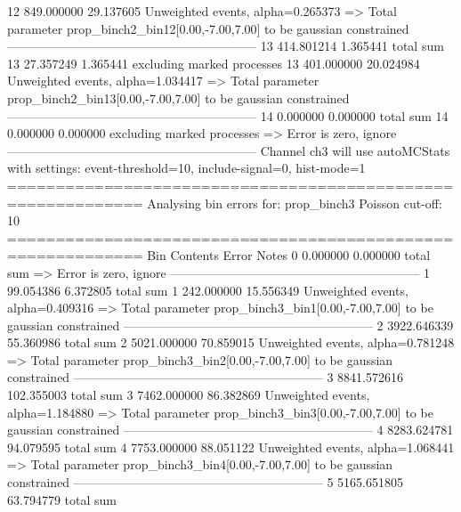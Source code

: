12         849.000000      29.137605       Unweighted events, alpha=0.265373
  => Total parameter prop_binch2_bin12[0.00,-7.00,7.00] to be gaussian constrained
------------------------------------------------------------
13         414.801214      1.365441        total sum                     
13         27.357249       1.365441        excluding marked processes    
13         401.000000      20.024984       Unweighted events, alpha=1.034417
  => Total parameter prop_binch2_bin13[0.00,-7.00,7.00] to be gaussian constrained
------------------------------------------------------------
14         0.000000        0.000000        total sum                     
14         0.000000        0.000000        excluding marked processes    
  => Error is zero, ignore      
------------------------------------------------------------
Channel ch3 will use autoMCStats with settings: event-threshold=10, include-signal=0, hist-mode=1
============================================================
Analysing bin errors for: prop_binch3
Poisson cut-off: 10
============================================================
Bin        Contents        Error           Notes                         
0          0.000000        0.000000        total sum                     
  => Error is zero, ignore      
------------------------------------------------------------
1          99.054386       6.372805        total sum                     
1          242.000000      15.556349       Unweighted events, alpha=0.409316
  => Total parameter prop_binch3_bin1[0.00,-7.00,7.00] to be gaussian constrained
------------------------------------------------------------
2          3922.646339     55.360986       total sum                     
2          5021.000000     70.859015       Unweighted events, alpha=0.781248
  => Total parameter prop_binch3_bin2[0.00,-7.00,7.00] to be gaussian constrained
------------------------------------------------------------
3          8841.572616     102.355003      total sum                     
3          7462.000000     86.382869       Unweighted events, alpha=1.184880
  => Total parameter prop_binch3_bin3[0.00,-7.00,7.00] to be gaussian constrained
------------------------------------------------------------
4          8283.624781     94.079595       total sum                     
4          7753.000000     88.051122       Unweighted events, alpha=1.068441
  => Total parameter prop_binch3_bin4[0.00,-7.00,7.00] to be gaussian constrained
------------------------------------------------------------
5          5165.651805     63.794779       total sum                     
